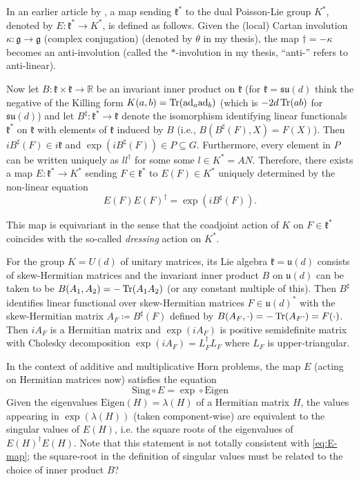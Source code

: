 \documentclass[notitlepage]{article}
\begin{document}
In an earlier article by \citeauthor{alekseev2001linearization} \cite{alekseev2001linearization}, a map sending $\mathfrak k^{*}$ to the dual Poisson-Lie group $K^{*}$, denoted by $E : \mathfrak k^{*} \to K^{*}$, is defined as follows.
Given the (local) Cartan involution $\kappa : \mathfrak g \to \mathfrak g$ (complex conjugation) (denoted by $\theta$ in my thesis), the map $\dagger = - \kappa$ becomes an anti-involution (called the $\ast$-involution in my thesis, ``anti-'' refers to anti-linear). 

Now let $B : \mathfrak k \times \mathfrak k \to \mathbb R$ be an invariant inner product on $\mathfrak k$ (for $\mathfrak k = \mathfrak{su}(d)$ think the negative of the Killing form $K(a,b) = \operatorname{Tr}(\mathrm{ad}_a \mathrm{ad}_{b})$ (which is $-2 d \operatorname{Tr}(ab)$ for $\mathfrak{su}(d)$) and let $B^{\sharp} : \mathfrak k^{*} \to \mathfrak k$ denote the isomorphism identifying linear functionals $\mathfrak k^{*}$ on $\mathfrak k$ with elements of $\mathfrak k$ induced by $B$ (i.e., $B(B^{\sharp}(F),X) = F(X)$).
Then $i B^{\sharp}(F) \in i \mathfrak k$ and $\exp(i B^{\sharp}(F)) \in P \subseteq G$.
Furthermore, every element in $P$ can be written uniquely as $l l^{\dagger}$ for some some $l \in K^{*} = A N$.
Therefore, there exists a map $E : \mathfrak k^{*} \to K^{*}$ sending $F \in \mathfrak k^{*}$ to $E(F) \in K^{*}$ uniquely determined by the non-linear equation
\begin{equation}
    \label{eq:E-map}
    E(F) E(F)^{\dagger} = \exp( i B^{\sharp}(F)).
\end{equation}

This map is equivariant in the sense that the coadjoint action of $K$ on $F \in \mathfrak k^{*}$ coincides with the so-called \textit{dressing} action on $K^{*}$.

For the group $K = U(d)$ of unitary matrices, its Lie algebra $\mathfrak k = \mathfrak u(d)$ consists of skew-Hermitian matrices and the invariant inner product $B$ on $\mathfrak u(d)$ can be taken to be $B(A_1, A_2) = - \operatorname{Tr}(A_1 A_2)$ (or any constant multiple of this).
Then $B^{\sharp}$ identifies linear functional over skew-Hermitian matrices $F \in \mathfrak u(d)^{*}$ with the skew-Hermitian matrix $A_F \coloneqq B^{\sharp}(F)$ defined by $B(A_F, \cdot) = - \operatorname{Tr}(A_F \cdot) = F(\cdot)$.
Then $i A_F$ is a Hermitian matrix and $\exp(i A_F)$ is positive semidefinite matrix with Cholesky decomposition $\exp(i A_F) = L_F^{\dagger}L_F$ where $L_F$ is upper-triangular.

In the context of additive and multiplicative Horn problems, the map $E$ (acting on Hermitian matrices now) satisfies the equation
\begin{equation}
    \mathrm{Sing} \circ E = \exp \circ \mathrm{Eigen}
\end{equation}
Given the eigenvalues $\mathrm{Eigen}(H) = \lambda(H)$ of a Hermitian matrix $H$, the values appearing in $\exp(\lambda(H))$ (taken component-wise) are equivalent to the singular values of $E(H)$, i.e. the square roots of the eigenvalues of $E(H)^{\dagger} E(H)$.
Note that this statement is not totally consistent with \cref{eq:E-map}; the square-root in the definition of singular values must be related to the choice of inner product $B$?
\end{document}

